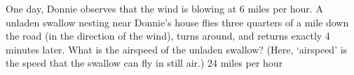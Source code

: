{One day, Donnie observes that the wind is blowing at 6 miles per hour.  A unladen swallow nesting near Donnie's house flies three quarters of a mile down the road (in the direction of the wind), turns around, and returns exactly 4 minutes later.  What is the airspeed of the unladen swallow?  (Here, `airspeed' is the speed that the swallow can fly in still air.) }
{24 miles per hour}